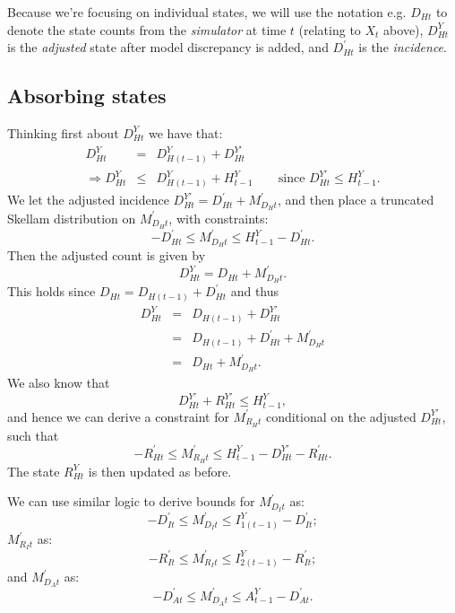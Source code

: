 \documentclass[a4paper]{article}
\begin{document}
Because we're focusing on individual states, we will use the notation e.g. $D_{Ht}$ to denote the state counts from the \textit{simulator} at time $t$ (relating to $X_t$ above), $D^Y_{Ht}$ is the \textit{adjusted} state after model discrepancy is added, and $D^\prime_{Ht}$ is the \textit{incidence}.

\subsection{Absorbing states}

Thinking first about $D^Y_{Ht}$ we have that:
\begin{eqnarray*}
    D^Y_{Ht} &=& D^Y_{H(t - 1)} + D^{Y\prime}_{Ht}\\
    \Rightarrow D^Y_{Ht} &\leq& D^Y_{H(t - 1)} + H^Y_{t-1} \qquad \mbox{since $D^{Y\prime}_{Ht} \leq H^Y_{t - 1}$}.
\end{eqnarray*}
We let the adjusted incidence $D^{Y\prime}_{Ht} = D^\prime_{Ht} + M^\prime_{D_Ht}$, and then place a truncated Skellam distribution on $M^\prime_{D_Ht}$, with constraints:
\begin{equation*}
    -D^\prime_{Ht} \leq M^\prime_{D_Ht} \leq H^Y_{t - 1} - D^\prime_{Ht}.
\end{equation*}
Then the adjusted count is given by
\begin{equation*}
    D^Y_{Ht} = D_{Ht} + M^\prime_{D_Ht}.
\end{equation*}
This holds since $D_{Ht} = D_{H(t - 1)} + D^\prime_{Ht}$ and thus 
\begin{eqnarray*}
    D^Y_{Ht} &=& D_{H(t - 1)} + D^{Y\prime}_{Ht}\\
    &=& D_{H(t - 1)} + D^\prime_{Ht} + M^\prime_{D_Ht}\\
    &=& D_{Ht} + M^\prime_{D_Ht}.
\end{eqnarray*}
We also know that
\begin{equation*}
    D^{Y\prime}_{Ht} + R^{Y\prime}_{Ht} \leq H^Y_{t - 1},
\end{equation*}
and hence we can derive a constraint for $M^\prime_{R_Ht}$ conditional on the adjusted $D^{Y\prime}_{Ht}$, such that
\begin{equation*}
    -R^\prime_{Ht} \leq M^\prime_{R_Ht} \leq H^Y_{t - 1} - D^{Y\prime}_{Ht} - R^\prime_{Ht}.
\end{equation*}
The state $R^Y_{Ht}$ is then updated as before.

We can use similar logic to derive bounds for $M^\prime_{D_It}$ as:
\begin{equation*}
    -D^\prime_{It} \leq M^\prime_{D_It} \leq I^Y_{1(t - 1)} - D^\prime_{It};
\end{equation*}
$M^\prime_{R_It}$ as:
\begin{equation*}
    -R^\prime_{It} \leq M^\prime_{R_It} \leq I^Y_{2(t - 1)} - R^\prime_{It};
\end{equation*}
and $M^\prime_{D_At}$ as:
\begin{equation*}
    -D^\prime_{At} \leq M^\prime_{D_At} \leq A^Y_{t - 1} - D^\prime_{At}.
\end{equation*}
\end{document}
